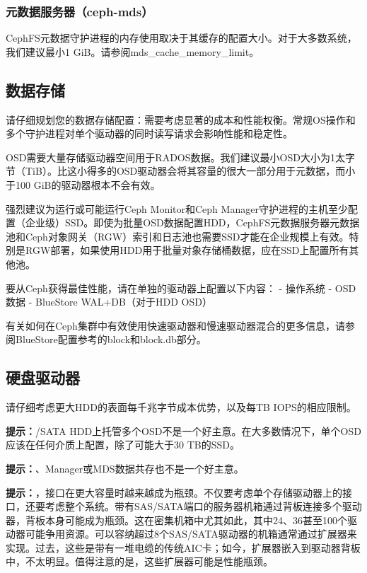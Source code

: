 \documentclass[12pt,UTF8]{ctexbook}
\begin{document}
\subsubsection{元数据服务器（ceph-mds）}
CephFS元数据守护进程的内存使用取决于其缓存的配置大小。对于大多数系统，我们建议最小1 GiB。请参阅mds_cache_memory_limit。

\subsection{数据存储}
请仔细规划您的数据存储配置：需要考虑显著的成本和性能权衡。常规OS操作和多个守护进程对单个驱动器的同时读写请求会影响性能和稳定性。

OSD需要大量存储驱动器空间用于RADOS数据。我们建议最小OSD大小为1太字节（TiB）。比这小得多的OSD驱动器会将其容量的很大一部分用于元数据，而小于100 GiB的驱动器根本不会有效。

强烈建议为运行或可能运行Ceph Monitor和Ceph Manager守护进程的主机至少配置（企业级）SSD。即使为批量OSD数据配置HDD，CephFS元数据服务器元数据池和Ceph对象网关（RGW）索引和日志池也需要SSD才能在企业规模上有效。特别是RGW部署，如果使用HDD用于批量对象存储桶数据，应在SSD上配置所有其他池。

要从Ceph获得最佳性能，请在单独的驱动器上配置以下内容：
- 操作系统
- OSD数据
- BlueStore WAL+DB（对于HDD OSD）

有关如何在Ceph集群中有效使用快速驱动器和慢速驱动器混合的更多信息，请参阅BlueStore配置参考的block和block.db部分。

\subsection{硬盘驱动器}
请仔细考虑更大HDD的表面每千兆字节成本优势，以及每TB IOPS的相应限制。

\textbf{提示：}/SATA HDD上托管多个OSD不是一个好主意。在大多数情况下，单个OSD应该在任何介质上配置，除了可能大于30 TB的SSD。

\textbf{提示：}、Manager或MDS数据共存也不是一个好主意。

\textbf{提示：}，接口在更大容量时越来越成为瓶颈。不仅要考虑单个存储驱动器上的接口，还要考虑整个系统。带有SAS/SATA端口的服务器机箱通过背板连接多个驱动器，背板本身可能成为瓶颈。这在密集机箱中尤其如此，其中24、36甚至100个驱动器可能争用资源。可以容纳超过8个SAS/SATA驱动器的机箱通常通过扩展器来实现。过去，这些是带有一堆电缆的传统AIC卡；如今，扩展器嵌入到驱动器背板中，不太明显。值得注意的是，这些扩展器可能是性能瓶颈。
\end{document}
